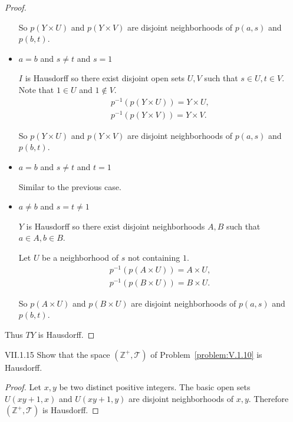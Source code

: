 \begin{proof}
\begin{itemize}
		      So \( p(Y \times U) \) and \( p(Y \times V) \) are disjoint neighborhoods of \( p(a, s) \) and \( p(b, t) \).
		\item \( a = b \) and \( s \ne t \) and \( s = 1 \)

		      \( I \) is Hausdorff so there exist disjoint open sets \( U, V \) such that \( s \in U, t \in V \). Note that \( 1 \in U \) and \( 1 \notin V \).
		      \[
			      \begin{split}
				      p^{-1}(p(Y \times U)) = Y \times U, \\
				      p^{-1}(p(Y \times V)) = Y \times V.
			      \end{split}
		      \]

		      So \( p(Y \times U) \) and \( p(Y \times V) \) are disjoint neighborhoods of \( p(a, s) \) and \( p(b, t) \).
		\item \( a = b \) and \( s \ne t \) and \( t = 1 \)

		      Similar to the previous case.
		\item \( a \ne b \) and \( s = t \ne 1 \)

		      \( Y \) is Hausdorff so there exist disjoint neighborhoods \( A, B \) such that \( a \in A, b \in B \).

		      Let \( U \) be a neighborhood of \( s \) not containing \( 1 \).
		      \[
			      \begin{split}
				      p^{-1}(p(A \times U)) = A \times U, \\
				      p^{-1}(p(B \times U)) = B \times U.
			      \end{split}
		      \]

		      So \( p(A \times U) \) and \( p(B \times U) \) are disjoint neighborhoods of \( p(a, s) \) and \( p(b, t) \).
	\end{itemize}

	Thus \( TY \) is Hausdorff.
\end{proof}

\begin{problem}{VII.1.15}
Show that the space \( (\mathbb{Z}^{+}, \mathscr{T}) \) of Problem~\ref{problem:V.1.10} is Hausdorff.
\end{problem}

\begin{proof}
	Let \( x, y \) be two distinct positive integers. The basic open sets \( U(xy + 1, x) \) and \( U(xy + 1, y) \) are disjoint neighborhoods of \( x, y \). Therefore \( (\mathbb{Z}^{+}, \mathscr{T}) \) is Hausdorff.
\end{proof}

